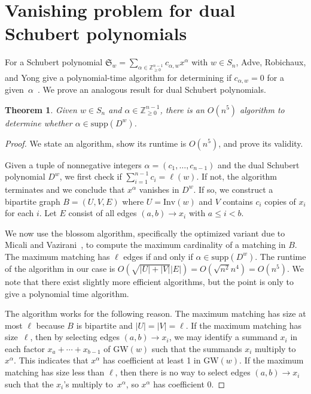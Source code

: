 \documentclass[11pt]{article}
\newtheorem{theorem}[theo]{Theorem}
\theoremstyle{definition}
\numberwithin{equation}{section}
\newcommand{\GW}{\mathrm{GW}}
\newcommand{\Inv}{\mathrm{Inv}}
\newcommand{\supp}{\mathrm{supp}}
\newcommand{\ZZZ}{\mathbb{Z}_{\ge 0}}
\begin{document}
\section{Vanishing problem for dual Schubert polynomials}\label{section:vanishing}

For a Schubert polynomial $\mathfrak{S}_w = \sum_{\alpha \in \ZZZ^{n-1}} c_{\alpha,w}x^{\alpha}$ with $w \in S_n$, Adve, Robichaux, and Yong give a polynomial-time algorithm for determining if $c_{\alpha,w} = 0$ for a given~$\alpha$~\cite{ARY}. We prove an analogous result for dual Schubert polynomials.
\begin{theorem}\label{thm:vanish}
    Given $w \in S_n$ and $\alpha \in \ZZZ^{n-1}$, there is an $O(n^5)$ algorithm to determine whether $\alpha \in \supp(D^w)$.
\end{theorem}
\begin{proof}
    We state an algorithm, show its runtime is $O(n^5)$, and prove its validity. 

    Given a tuple of nonnegative integers $\alpha = (c_1, \ldots, c_{n-1})$ and the dual Schubert polynomial $D^w$, we first check if $\sum_{i=1}^{n-1} c_i = \ell(w)$. If not, the algorithm terminates and we conclude that $x^\alpha$ vanishes in $D^w$. If so, we construct a bipartite graph $B = (U,V,E)$ where $U = \Inv(w)$ and 
    $V$ contains $c_i$ copies of $x_i$ for each $i$. 
    Let $E$ consist of all edges $(a,b) \to x_i$ with $a \le i < b$. 

    We now use the blossom algorithm, specifically the optimized variant due to Micali and Vazirani~\cite{inproceedings}, to compute the maximum cardinality of a matching in $B$. The maximum matching has $\ell$ edges if and only if $ \alpha \in \supp(D^w)$. The runtime of the algorithm in our case is $O(\sqrt{|U|+|V|}|E|) = O(\sqrt{n^2}n^4) = O(n^5)$. We note that there exist slightly more efficient algorithms, but the point is only to give a polynomial time algorithm.

    The algorithm works for the following reason. The maximum matching has size at most $\ell$ because $B$ is bipartite and $|U| = |V| = \ell$. If the maximum matching has size~$\ell$, then by selecting edges $(a,b) \to x_i$, we may identify a summand $x_i$ in each factor $x_a + \cdots + x_{b-1}$ of $\GW(w)$ such that the summands $x_i$ multiply to $x^\alpha$. This indicates that $x^\alpha$ has coefficient at least 1 in $\GW(w)$. If the maximum matching has size less than $\ell$, then there is no way to select edges $(a,b) \to x_i$ such that the $x_i$'s multiply to~$x^\alpha$, so $x^{\alpha}$ has coefficient 0.
\end{proof}
\end{document}
